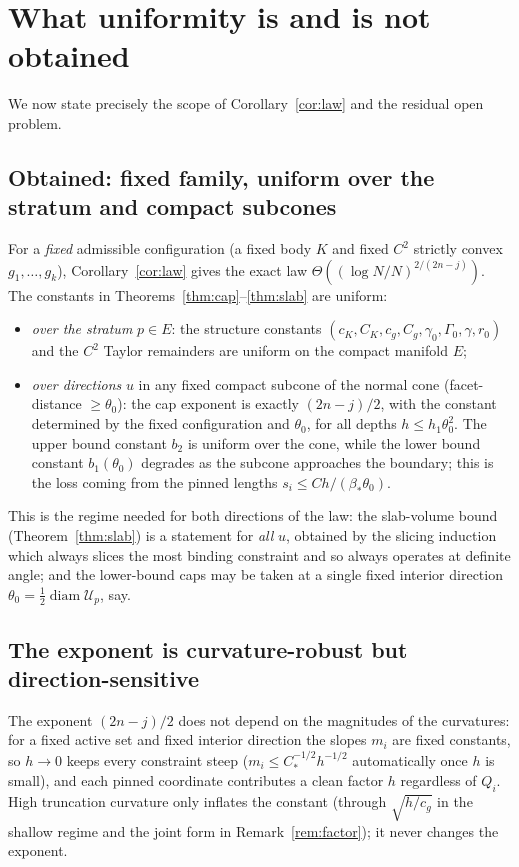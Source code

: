 \documentclass[11pt]{article}
\begin{document}
\section{What uniformity is and is not obtained}\label{sec:uniform}

We now state precisely the scope of Corollary~\ref{cor:law} and the residual
open problem.

\subsection{Obtained: fixed family, uniform over the stratum and compact subcones}

For a \emph{fixed} admissible configuration (a fixed body $K$ and fixed $C^2$
strictly convex $g_1,\dots,g_k$), Corollary~\ref{cor:law} gives the exact law
$\Theta((\log N/N)^{2/(2n-j)})$.  The constants in
Theorems~\ref{thm:cap}--\ref{thm:slab} are uniform:
\begin{itemize}
\item \emph{over the stratum} $p\in E$: the structure constants
$(c_K,C_K,c_g,C_g,\gamma_0,\Gamma_0,\gamma,r_0)$ and the $C^2$ Taylor remainders
are uniform on the compact manifold $E$;
\item \emph{over directions} $u$ in any fixed compact subcone of the normal cone
(facet-distance $\ge\theta_0$): the cap exponent is exactly $(2n-j)/2$, with the
constant determined by the fixed configuration and \(\theta_0\), for all depths
$h\le h_1\theta_0^2$.  The upper bound constant $b_2$ is uniform over the cone,
while the lower bound constant $b_1(\theta_0)$ degrades as the subcone
approaches the boundary; this is the loss coming from the pinned lengths
$s_i\le Ch/(\beta_*\theta_0)$.
\end{itemize}
This is the regime needed for both directions of the law: the slab-volume bound
(Theorem~\ref{thm:slab}) is a statement for \emph{all} $u$, obtained by the
slicing induction which always slices the most binding constraint and so always
operates at definite angle; and the lower-bound caps may be taken at a single
fixed interior direction $\theta_0=\frac12\operatorname{diam}\mathcal U_p$, say.

\subsection{The exponent is curvature-robust but direction-sensitive}

The exponent $(2n-j)/2$ does not depend on the magnitudes of the curvatures: for
a fixed active set and fixed interior direction the slopes $m_i$ are fixed
constants, so $h\to0$ keeps every constraint steep ($m_i\le C_*^{-1/2}h^{-1/2}$
automatically once $h$ is small), and each pinned coordinate contributes a clean
factor $h$ regardless of $Q_i$.  High truncation curvature only inflates the
constant (through $\sqrt{h/c_g}$ in the shallow regime and the joint form in
Remark~\ref{rem:factor}); it never changes the exponent.
\end{document}
